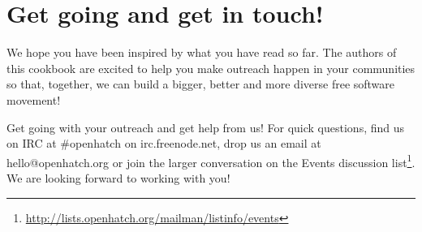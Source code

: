 \chapter{Get going and get in touch!}
We hope you have been inspired by what you have read so far. The authors of this cookbook are excited to help you make outreach happen in your communities so that, together, we can build a bigger, better and more diverse free software movement!

Get going with your outreach and get help from us! For quick questions, find us on IRC at \#openhatch on irc.freenode.net, drop us an email at hello@openhatch.org or join the larger conversation on the Events discussion list\footnote{\url{http://lists.openhatch.org/mailman/listinfo/events}}. We are looking forward to working with you!